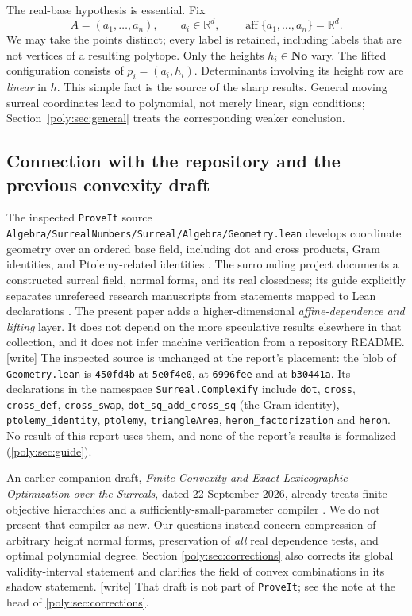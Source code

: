 \documentclass[11pt,a4paper]{article}
\numberwithin{equation}{section}
\theoremstyle{plain}
\newcommand{\wtag}{\textup{[write]}}%
\newcommand{\No}{\mathbf{No}}
\newcommand{\R}{\mathbb R}
\newcommand{\aff}{\operatorname{aff}}
\newcommand{\repo}{\texttt{ProveIt}}
\begin{document}
The real-base hypothesis is essential. Fix
\[
 A=(a_1,\ldots,a_n),\qquad a_i\in\R^d,
 \qquad \aff\{a_1,\ldots,a_n\}=\R^d.
\]
We may take the points distinct; every label is retained, including labels
that are not vertices of a resulting polytope. Only the heights
$h_i\in\No$ vary. The lifted configuration consists of
$p_i=(a_i,h_i)$. Determinants involving its height row are \emph{linear} in
$h$. This simple fact is the source of the sharp results. General moving
surreal coordinates lead to polynomial, not merely linear, sign conditions;
Section~\ref{poly:sec:general} treats the corresponding weaker conclusion.

\subsection{Connection with the repository and the previous convexity draft}

The inspected \texttt{ProveIt} source
\nolinkurl{Algebra/SurrealNumbers/Surreal/Algebra/Geometry.lean}
develops coordinate geometry over an ordered base field, including dot and
cross products, Gram identities, and Ptolemy-related identities
\cite{fs:RepoGeometry}. The surrounding project documents a constructed surreal
field, normal forms, and its real closedness; its guide explicitly separates
unrefereed research manuscripts from statements mapped to Lean declarations
\cite{fs:RepoGuide}. The present paper adds a higher-dimensional
\emph{affine-dependence and lifting} layer. It does not depend on the more
speculative results elsewhere in that collection, and it does not infer
machine verification from a repository README.
\wtag{} The inspected source is unchanged at the report's placement: the
blob of \nolinkurl{Geometry.lean} is \texttt{450fd4b} at \texttt{5e0f4e0},
at \texttt{6996fee} and at \texttt{b30441a}. Its declarations in the
namespace \texttt{Surreal.Complexify} include \texttt{dot}, \texttt{cross},
\texttt{cross\_def}, \texttt{cross\_swap}, \texttt{dot\_sq\_add\_cross\_sq}
(the Gram identity), \texttt{ptolemy\_identity}, \texttt{ptolemy},
\texttt{triangleArea}, \texttt{heron\_factorization} and \texttt{heron}.
No result of this report uses them, and none of the report's results is
formalized (\cref{poly:sec:guide}).

An earlier companion draft, \emph{Finite Convexity and Exact Lexicographic
Optimization over the Surreals}, dated 22 September 2026, already treats
finite objective hierarchies and a sufficiently-small-parameter compiler
\cite{fs:PriorDraft}. We do not present that compiler as new. Our questions
instead concern compression of arbitrary height normal forms, preservation
of \emph{all} real dependence tests, and optimal polynomial degree. Section
\ref{poly:sec:corrections} also corrects its global validity-interval statement
and clarifies the field of convex combinations in its shadow statement.
\wtag{} That draft is not part of \repo{}; see the note at the head of
\cref{poly:sec:corrections}.
\end{document}
